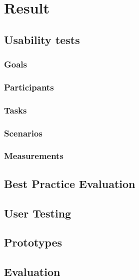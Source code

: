 \chapter{Result}
\label{chap:result}

\section{Usability tests}

\subsection{Goals}
\label{sub:goals}

\subsection{Participants}
\label{sub:participants}

\subsection{Tasks}
\label{sub:tasks}

\subsection{Scenarios}
\label{sub:scenarios}

\subsection{Measurements}
\label{sub:measurements}

\section{Best Practice Evaluation}
%
\section{User Testing}
%
\section{Prototypes}
%
\section{Evaluation}
%
